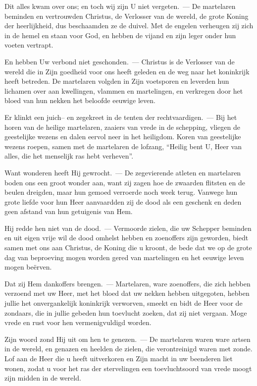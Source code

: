 \documentclass[12pt,twoside,a5paper]{article}
\begin{document}
\begin{halfparskip}
  Dit alles kwam over ons; en toch wij zijn U niet vergeten.~--- De martelaren beminden en vertrouwden Christus, de Verlosser van de wereld, de grote Koning der heerlijkheid, dus beschaamden ze de duivel. Met de engelen verheugen zij zich in de hemel en staan voor God, en hebben de vijand en zijn leger onder hun voeten vertrapt.

  En hebben Uw verbond niet geschonden.~--- Christus is de Verlosser van de wereld die in Zijn goedheid voor ons heeft geleden en de weg naar het koninkrijk heeft betreden. De martelaren volgden in Zijn voetsporen en leverden hun lichamen over aan kwellingen, vlammen en martelingen, en verkregen door het bloed van hun nekken het beloofde eeuwige leven.

  Er klinkt een juich-- en zegekreet in de tenten der rechtvaardigen.~--- Bij het horen van de heilige martelaren, zaaiers van vrede in de schepping, vliegen de geestelijke wezens en dalen eervol neer in het heiligdom. Koren van geestelijke wezens roepen, samen met de martelaren de lofzang, ``Heilig bent U, Heer van alles, die het menselijk ras hebt verheven''.

  Want wonderen heeft Hij gewrocht.~--- De zegevierende atleten en martelaren boden ons een groot wonder aan, want zij zagen hoe de zwaarden flitsten en de beulen dreigden, maar hun gemoed verroerde noch week terug. Vanwege hun grote liefde voor hun Heer aanvaardden zij de dood als een geschenk en deden geen afstand van hun getuigenis van Hem.

  Hij redde hen niet van de dood.~--- Vermoorde zielen, die uw Schepper beminden en uit eigen vrije wil de dood omhelst hebben en zoenoffers zijn geworden, biedt samen met ons aan Christus, de Koning die u kroont, de bede dat we op de grote dag van beproeving mogen worden gered van martelingen en het eeuwige leven mogen beërven.

  Dat zij Hem dankoffers brengen.~--- Martelaren, ware zoenoffers, die zich hebben verzoend met uw Heer, met het bloed dat uw nekken hebben uitgegoten, hebben jullie het onvergankelijk koninkrijk verworven, smeekt en bidt de Heer voor de zondaars, die in jullie gebeden hun toevlucht zoeken, dat zij niet vergaan. Moge vrede en rust voor hen vermenigvuldigd worden.

  Zijn woord zond Hij uit om hen te genezen.~--- De martelaren waren ware artsen in de wereld, en genazen en heelden de zielen, die verontreinigd waren met zonde. Lof aan de Heer die u heeft uitverkoren en Zijn macht in uw beenderen liet wonen, zodat u voor het ras der stervelingen een toevluchtsoord van vrede moogt zijn midden in de wereld.


\end{halfparskip}
\end{document}
